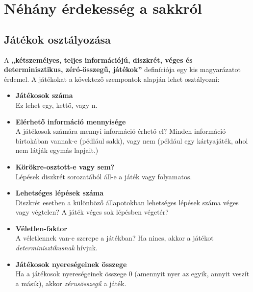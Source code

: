 \documentclass[twoside, a4paper, 12pt]{book}
\begin{document}
\chapter{Néhány érdekesség a sakkról}
\section{Játékok osztályozása}
A \textbf{„kétszemélyes, teljes információjú, diszkrét, véges és determinisztikus, zéró-összegű, játékok”} definíciója egy kis magyarázatot érdemel. A játékokat a kövektező szempontok alapján lehet osztályozni:

\begin{itemize}
	\item \textbf{Játékosok száma} \\
	Ez lehet egy, kettő, vagy n.
	
	\item \textbf{Elérhető információ mennyisége} \\
	A játékosok számára mennyi információ érhető el? Minden információ birtokában vannak-e (pédlául sakk), vagy nem (például egy kártyajáték, ahol nem látják egymás lapjait.)
	
	\item \textbf{Körökre-osztott-e vagy sem?} \\
	Lépések diszkrét sorozatából áll-e a játék vagy folyamatos.
	
	\item \textbf{Lehetséges lépések száma} \\
	Diszkrét esetben a különböző állapotokban lehetséges lépések száma véges vagy végtelen? A játék véges sok lépésben végetér?
	
	\item \textbf{Véletlen-faktor} \\
	A véletlennek van-e szerepe a játékban? Ha nincs, akkor a játékot \textit{determinisztikusnak} hívjuk.
	
	\item \textbf{Játékosok nyereségeinek összege} \\
	Ha a játékosok nyereségeinek összege 0 (amennyit nyer az egyik, annyit veszít a másik), akkor \textit{zérusösszegű} a játék.
\end{itemize}
\end{document}
